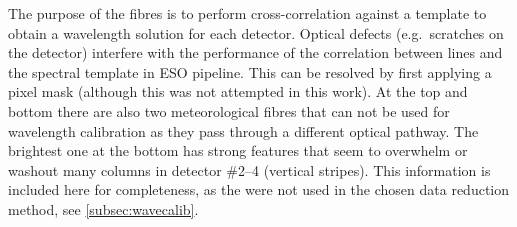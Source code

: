 The purpose of the \thar{} fibres is to perform cross-correlation against a \thar{} template to obtain a wavelength solution for each detector.
Optical defects (e.g.\ scratches on the detector) interfere with the performance of the correlation between \thar{} lines and the spectral template in {ESO} pipeline.
This can be resolved by first applying a pixel mask (although this was not attempted in this work).
At the top and bottom there are also two meteorological fibres that can not be used for wavelength calibration as they pass through a different optical pathway.
The brightest one at the bottom has strong features that seem to overwhelm or washout many columns in detector \#2--4 (vertical stripes).
This information is included here for completeness, as the \thar{} were not used in the chosen data reduction method, see \cref{subsec:wavecalib}.


